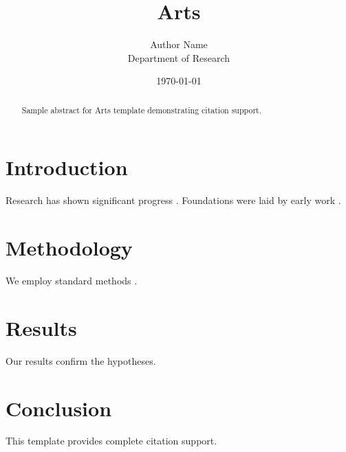 \documentclass{mdpi}
\title{Arts}
\author{Author Name \\ \small Department of Research}
\date{\today}
\begin{document}
\maketitle

\begin{abstract}
Sample abstract for Arts template demonstrating citation support.
\end{abstract}

\section{Introduction}
Research has shown significant progress \citep{einstein1905}. Foundations were laid by early work \citep{turing1950}.

\section{Methodology}
We employ standard methods \citep{knuth1984}.

\section{Results}
Our results confirm the hypotheses.

\section{Conclusion}
This template provides complete citation support.



\end{document}
